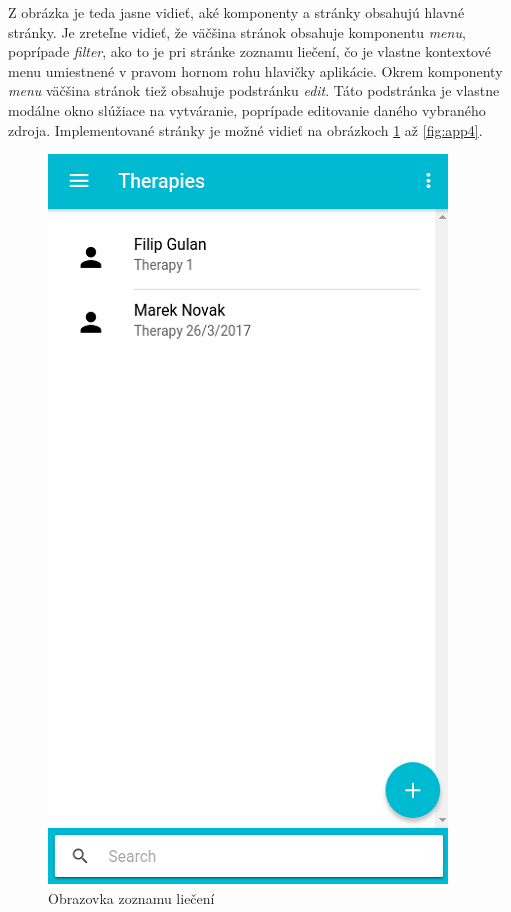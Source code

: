 Z obrázka je teda jasne vidieť, aké komponenty a stránky obsahujú hlavné stránky. Je zreteľne vidieť, že väčšina stránok obsahuje komponentu \textit{menu}, poprípade \textit{filter}, ako to je pri stránke zoznamu liečení, čo je vlastne kontextové menu umiestnené v pravom hornom rohu hlavičky aplikácie. Okrem komponenty \textit{menu} väčšina stránok tiež obsahuje podstránku \textit{edit}. Táto podstránka je vlastne modálne okno slúžiace na vytváranie, poprípade editovanie daného vybraného zdroja. Implementované stránky je možné vidieť na obrázkoch \ref{fig:app1} až \ref{fig:app4}.
 \begin{figure}[h]
   \begin{minipage}{0.48\textwidth}
     \centering
     \includegraphics[scale=0.70]{fig/app1.png}
      \caption{Obrazovka zoznamu liečení}
      \label{fig:app1}
   \end{minipage}\hfill

\end{figure}
